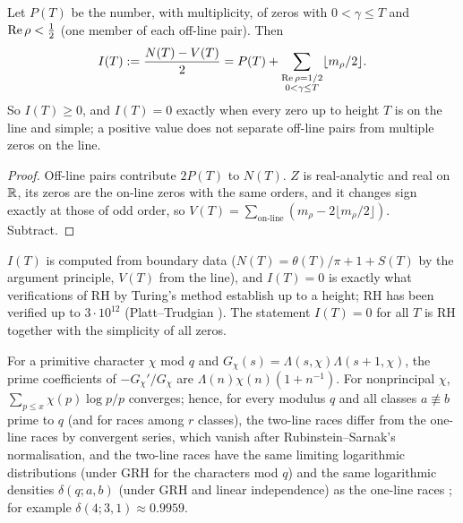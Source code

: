 \begin{proposition}\label{prop:index}
Let $P(T)$ be the number, with multiplicity, of zeros with $0<\gamma\le T$ and $\operatorname{Re}\rho<\tfrac12$ (one member of each off-line pair). Then
\[
I(T):=\frac{N(T)-V(T)}2=P(T)+\sum_{\substack{\operatorname{Re}\rho=1/2\\0<\gamma\le T}}\lfloor m_\rho/2\rfloor .
\]
So $I(T)\ge0$, and $I(T)=0$ exactly when every zero up to height $T$ is on the line and simple; a positive value does not separate off-line pairs from multiple zeros on the line.
\end{proposition}

\begin{proof}
Off-line pairs contribute $2P(T)$ to $N(T)$. $Z$ is real-analytic and real on $\mathbb{R}$, its zeros are the on-line zeros with the same orders, and it changes sign exactly at those of odd order, so $V(T)=\sum_{\text{on-line}}(m_\rho-2\lfloor m_\rho/2\rfloor)$. Subtract.
\end{proof}

$I(T)$ is computed from boundary data ($N(T)=\theta(T)/\pi+1+S(T)$ by the argument principle, $V(T)$ from the line), and $I(T)=0$ is exactly what verifications of RH by Turing's method \cite{Turing} establish up to a height; RH has been verified up to $3\cdot10^{12}$ (Platt--Trudgian \cite{PlattTrudgian}). The statement $I(T)=0$ for all $T$ is RH together with the simplicity of all zeros.

\begin{proposition}\label{prop:races}
For a primitive character $\chi$ mod $q$ and $G_\chi(s)=\Lambda(s,\chi)\Lambda(s+1,\chi)$, the prime coefficients of $-G_\chi'/G_\chi$ are $\Lambda(n)\chi(n)(1+n^{-1})$. For nonprincipal $\chi$, $\sum_{p\le x}\chi(p)\log p/p$ converges; hence, for every modulus $q$ and all classes $a\not\equiv b$ prime to $q$ (and for races among $r$ classes), the two-line races differ from the one-line races by convergent series, which vanish after Rubinstein--Sarnak's normalisation, and the two-line races have the same limiting logarithmic distributions (under GRH for the characters mod $q$) and the same logarithmic densities $\delta(q;a,b)$ (under GRH and linear independence) as the one-line races \cite{RubinsteinSarnak,Devin}; for example $\delta(4;3,1)\approx0.9959$.
\end{proposition}

